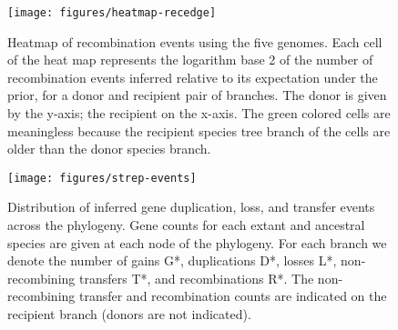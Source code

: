 \documentclass[10pt]{article}
\begin{document}
\begin{figure}
\texttt{[image: figures/heatmap-recedge]}
\caption{\label{fig:Heatmap-of-recombination}Heatmap of recombination events
using the five genomes.  Each cell of the heat map represents the logarithm base
2 of the number of recombination events inferred relative to its expectation
under the prior, for a donor and recipient pair of branches. The donor is given by
the y-axis; the recipient on the x-axis.  The green colored cells are meaningless
because the recipient species tree branch of the cells are older than the donor
species branch.}
\end{figure}
\clearpage{}

\begin{figure}
\texttt{[image: figures/strep-events]}
\caption{\label{fig:Gene-duplication-loss} Distribution of inferred gene
duplication, loss, and transfer events across the phylogeny.  Gene counts for
each extant and ancestral species are given at each node of the phylogeny.  For
each branch we denote the number of gains G*, duplications D*, losses L*,
non-recombining transfers T*, and recombinations R*.  The non-recombining
transfer and recombination counts are indicated on the recipient branch (donors
are not indicated).}
\end{figure}
\clearpage{}%
\end{document}
